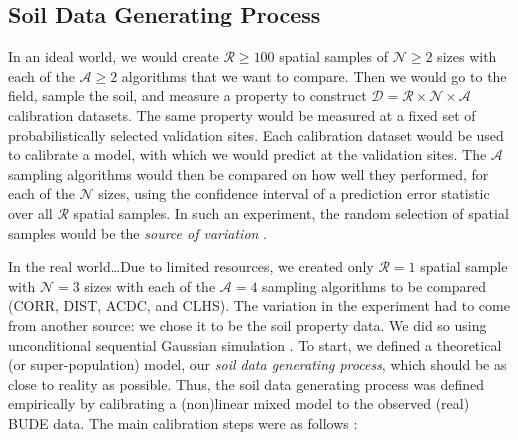 \subsection{Soil Data Generating Process}
\label{sec:chap08-simulation}

In an ideal world, we would create $\mathcal{R} \geq 100$ spatial samples of $\mathcal{N} \geq 2$ sizes with 
each of the $\mathcal{A} \geq 2$ algorithms that we want to compare. Then we would go to the field, sample the 
soil, and measure a property to construct $\mathcal{D} = \mathcal{R} \times \mathcal{N} \times \mathcal{A}$ 
calibration datasets. The same property would be measured at a fixed set of probabilistically selected 
validation sites. Each calibration dataset would be used to calibrate a model, with which we would predict at 
the validation sites. The $\mathcal{A}$ sampling algorithms would then be compared on how well 
they performed, for each of the $\mathcal{N}$ sizes, using the confidence interval of a prediction error 
statistic over all $\mathcal{R}$ spatial samples. In such an experiment, the random selection of spatial 
samples would be the \emph{source of variation} \cite{deGruijterEtAl1990}.

In the real world\dots Due to limited resources, we created only $\mathcal{R} = 1$ spatial sample with 
$\mathcal{N} = 3$ sizes with each of the $\mathcal{A} = 4$ sampling algorithms to be compared (CORR, DIST, 
ACDC, and CLHS). The variation in the experiment had to come from another source: we chose it to be the soil 
property data. We did so using unconditional sequential Gaussian simulation \cite{Goovaerts2001, Pebesma2004}. 
To start, we defined a theoretical (or super-population) model, our \emph{soil data generating process}, which 
should be as close to reality as possible. Thus, the soil data generating process was defined empirically by 
calibrating a (non)linear mixed model to the observed (real) BUDE data. The main calibration steps were as 
follows \cite{Breiman2001, LiawEtAl2002, DiggleEtAl2007, Lark2012}:

